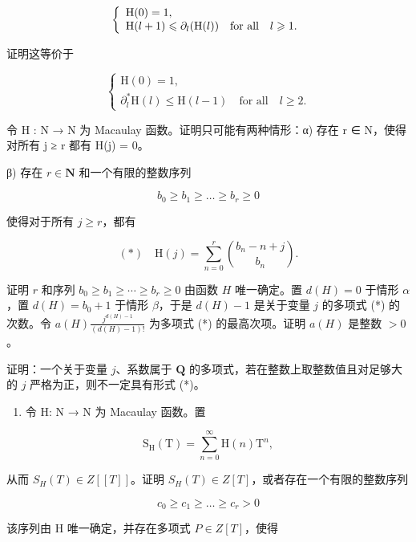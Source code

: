\[
\left\{ \begin{array}{l l} \mathrm{H} (0) = 1, \\ \mathrm{H} (l + 1) \leqslant \partial_ {l} (\mathrm{H} (l)) & \text {for all} \quad l \geqslant 1. \end{array} \right.
\]

证明这等价于

\[
\left\{ \begin{array}{l} \mathrm{H} (0) = 1, \\ \partial_ {l} ^ {*} \mathrm{H} (l) \leqslant \mathrm{H} (l - 1) \quad \text {for all} \quad l \geqslant 2. \end{array} \right.
\]

令 H : N → N 为 Macaulay 函数。证明只可能有两种情形：α) 存在 r ∈ N，使得对所有 j ≥ r 都有 H(j) = 0。

β) 存在 \(r \in \mathbf{N}\) 和一个有限的整数序列

\[
b _ {0} \geqslant b _ {1} \geqslant \dots \geqslant b _ {r} \geqslant 0
\]

使得对于所有 \(j \geqslant r\)，都有

\[
(*) \quad \mathrm{H} (j) = \sum_ {n = 0} ^ {r} \binom {b _ {n} - n + j} {b _ {n}}.
\]

证明 \(r\) 和序列 \(b_0 \geqslant b_1 \geqslant \cdots \geqslant b_r \geqslant 0\) 由函数 \(H\) 唯一确定。置 \(d(H) = 0\) 于情形 \(\alpha\)，置 \(d(H) = b_0 + 1\) 于情形 \(\beta\)，于是 \(d(H) - 1\) 是关于变量 \(j\) 的多项式 (*) 的次数。令 \(a(H) \frac{j^{d(H)-1}}{(d(H) - 1)!}\) 为多项式 (*) 的最高次项。证明 \(a(H)\) 是整数 \(> 0\)。

证明：一个关于变量 \(j\)、系数属于 \(\mathbf{Q}\) 的多项式，若在整数上取整数值且对足够大的 \(j\) 严格为正，则不一定具有形式 (*)。

\begin{enumerate}
\def\labelenumi{\alph{enumi})}
\setcounter{enumi}{2}
\tightlist
\item
  令 H: N → N 为 Macaulay 函数。置
\end{enumerate}

\[
\mathrm{S} _ {\mathrm{H}} (\mathrm{T}) = \sum_ {n = 0} ^ {\infty} \mathrm{H} (n) \mathrm{T} ^ {n},
\]

从而 \(S_{H}(T) \in Z[[T]]\)。证明 \(S_{H}(T) \in Z[T]\)，或者存在一个有限的整数序列

\[
c _ {0} \geqslant c _ {1} \geqslant \dots \geqslant c _ {r} > 0
\]

该序列由 H 唯一确定，并存在多项式 \(P \in Z[T]\)，使得

